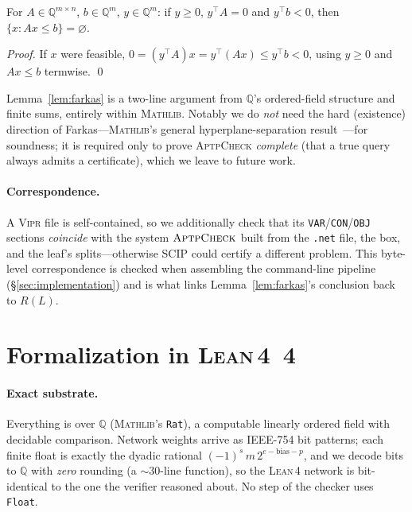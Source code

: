 \documentclass[runningheads]{llncs}
\newcommand{\Q}{\mathbb{Q}}
\newcommand{\reg}{R}
\newcommand{\leaf}{L}
\newcommand{\vipr}{\textsc{Vipr}}
\newcommand{\scip}{\textsc{SCIP}}
\newcommand{\tool}{\textsc{AptpCheck}}
\newcommand{\lean}{\textsc{Lean\,4}}
\newcommand{\mathlib}{\textsc{Mathlib}}
\newcommand{\code}[1]{\texttt{#1}}
\begin{document}
\begin{lemma}\label{lem:farkas}
For $A\in\Q^{m\times n}$, $b\in\Q^m$, $y\in\Q^m$: if $y\ge 0$, $y^{\!\top}\!A = 0$ and
$y^{\!\top} b < 0$, then $\{x : Ax\le b\}=\varnothing$.
\end{lemma}
\begin{proof}
If $x$ were feasible, $0=(y^{\!\top}\!A)x=y^{\!\top}(Ax)\le y^{\!\top} b<0$, using
$y\ge 0$ and $Ax\le b$ termwise. \qed
\end{proof}

Lemma~\ref{lem:farkas} is a two-line argument from $\Q$'s ordered-field structure and
finite sums, entirely within \mathlib. Notably we do \emph{not} need the hard
(existence) direction of Farkas---\mathlib's general hyperplane-separation
result~\cite{mathlib}---for soundness; it is required only to prove \tool{}
\emph{complete} (that a true query always admits a certificate), which we leave to
future work.

\paragraph{Correspondence.} A \vipr{} file is self-contained, so we additionally
check that its \code{VAR}/\code{CON}/\code{OBJ} sections \emph{coincide} with the system
$\tool$ built from the \code{.net} file, the box, and the leaf's splits---otherwise
\scip{} could certify a different problem. This byte-level correspondence is checked
when assembling the command-line pipeline (\S\ref{sec:implementation}) and is what
links Lemma~\ref{lem:farkas}'s conclusion back to $\reg(\leaf)$.

\section{Formalization in \lean{}~4}\label{sec:formalization}

\paragraph{Exact substrate.} Everything is over $\Q$ (\mathlib's \code{Rat}), a
computable linearly ordered field with decidable comparison. Network weights arrive as
IEEE-754 bit patterns; each finite float is exactly the dyadic rational
$(-1)^s\, m\, 2^{e-\text{bias}-p}$, and we decode bits to $\Q$ with \emph{zero}
rounding (a $\sim$30-line function), so the \lean{} network is bit-identical to the
one the verifier reasoned about. No step of the checker uses \code{Float}.
\end{document}
